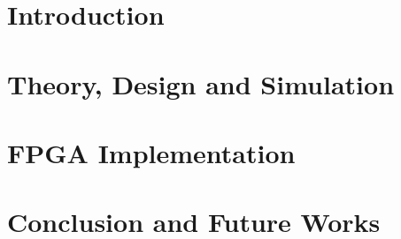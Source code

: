 \documentclass[12pt, oneside, a4paper]{scrartcl}
\begin{document}
\newpage
\setcounter{tocdepth}{1}
\tableofcontents
\newpage
\part[Introduction]{Introduction}

\newpage
\part[Theory, Design and Simulation]{Theory, Design and Simulation}

\newpage
\part[FPGA Implementation]{FPGA Implementation}

\newpage
\part[Conclusion and Future Works]{Conclusion and Future Works}

\end{document}
